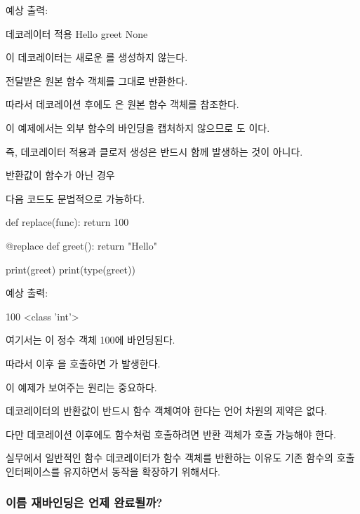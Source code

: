 예상 출력:

\begin{dhkzsh}
데코레이터 적용
Hello
greet
None
\end{dhkzsh}

이 데코레이터는 새로운 를 생성하지 않는다.

전달받은 원본 함수 객체를 그대로 반환한다.

따라서 데코레이션 후에도 은 원본 함수 객체를 참조한다.

이 예제에서는 외부 함수의 바인딩을 캡처하지 않으므로 도 이다.

즉, 데코레이터 적용과 클로저 생성은 반드시 함께 발생하는 것이 아니다.

\begin{dhknote}
\begin{dhksmry}[centered]
반환값이 함수가 아닌 경우
\end{dhksmry}
\end{dhknote}

다음 코드도 문법적으로 가능하다.

\begin{dhkcode}
def replace(func):
    return 100


@replace
def greet():
    return "Hello"


print(greet)
print(type(greet))
\end{dhkcode}

예상 출력:

\begin{dhkzsh}
100
<class 'int'>
\end{dhkzsh}

여기서는 이 정수 객체 100에 바인딩된다.

따라서 이후 을 호출하면 가 발생한다.

이 예제가 보여주는 원리는 중요하다.

데코레이터의 반환값이 반드시 함수 객체여야 한다는 언어 차원의 제약은 없다.

다만 데코레이션 이후에도 함수처럼 호출하려면 반환 객체가 호출 가능해야 한다.

실무에서 일반적인 함수 데코레이터가  함수 객체를 반환하는 이유도 기존 함수의 호출 인터페이스를 유지하면서 동작을 확장하기 위해서다.

\subsubsection{이름 재바인딩은 언제 완료될까?}

